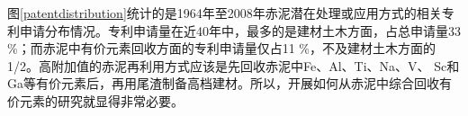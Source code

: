 图\ref{patentdistribution}统计的是1964年至2008年赤泥潜在处理或应用方式的相关专利申请分布情况\cite{klauber2011bauxite,chandra1996waste}。专利申请量在近40年中，最多的是建材土木方面，占总申请量33 \%；而赤泥中有价元素回收方面的专利申请量仅占11 \%，不及建材土木方面的1/2。高附加值的赤泥再利用方式应该是先回收赤泥中Fe、Al、Ti、Na、V、 Sc和Ga等有价元素后\cite{yu2012red,zhang2011recovery,smirnov1997investigation,liu2009application,zhong2009extraction}，再用尾渣制备高档建材\cite{liu2014influence}。所以，开展如何从赤泥中综合回收有价元素的研究就显得非常必要。